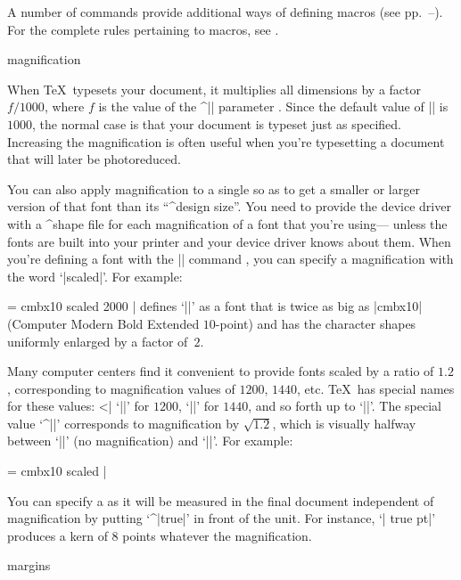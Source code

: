 {{{{{{{{{{{A number of commands provide additional ways of defining macros
(see pp.~--).
For the complete rules pertaining to macros, see .
}%
\endconcept


\concept magnification

When \TeX\ typesets your document, it multiplies all dimensions
by a
 factor $f/1000$,
where $f$ is the value of the ^|\mag| parameter \ctsref\mag.
Since the default value of |\mag| is $1000$, the normal case is that
your document is typeset just as specified.
Increasing the magnification is often useful when you're typesetting a document
that will later be photoreduced.

You can also apply magnification to a single  so as to get
a smaller or larger version of that font than its ``^{design size}''.  You
need to provide the device driver with a ^{shape file}
 for
each magnification of a font that you're using---%
unless the fonts are built into your printer and your device driver
knows about them.
When you're defining a font with
the |\font| command \ctsref{\font}, you can specify a magnification with
the word `|scaled|'.  For example:

\csdisplay
\font\largerbold = cmbx10 scaled 2000
|
defines `|\largerbold|' as a font that is
twice as big as |cmbx10| (Computer Modern
Bold Extended $10$-point) and has the character shapes
uniformly enlarged by a factor of~$2$.

Many computer centers find it convenient to provide fonts scaled by a ratio
of $1.2$, corresponding to magnification values of $1200$, $1440$, etc.
\TeX\ has special names for these values:
^^|\magstep|
`||' for $1200$,
`||' for $1440$, and so forth up to `||'.  The special
value `^|\magstephalf|' corresponds to magnification by $\sqrt{1.2}$, which
is visually halfway between `||' (no magnification) and
`||'.  For example:

\csdisplay
\font\bigbold = cmbx10 scaled \magstephalf
|

You can specify a  as it will be
measured in the final document independent of magnification by putting
`^|true|' in front of the unit.  For instance, `| true pt|'
produces a kern of $8$ points whatever the magnification.

\endconcept

\concept margins

}}}}}}}}}}
